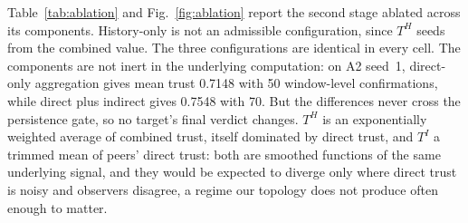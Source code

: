 Table~\ref{tab:ablation} and Fig.~\ref{fig:ablation} report the second stage
ablated across its components. History-only is not an admissible configuration,
since $T^H$ seeds from the combined value. The three configurations are
identical in every cell. The components are not inert in the underlying
computation: on A2 seed~1, direct-only aggregation gives mean trust 0.7148
with 50 window-level confirmations, while direct plus indirect gives 0.7548
with 70. But the differences never cross the persistence gate, so no target's
final verdict changes. $T^H$ is an exponentially weighted average of combined
trust, itself dominated by direct trust, and $T^I$ a trimmed mean of peers' direct trust: both are smoothed
functions of the same underlying signal, and they would be expected to diverge
only where direct trust is noisy and observers disagree, a regime our topology
does not produce often enough to matter.


